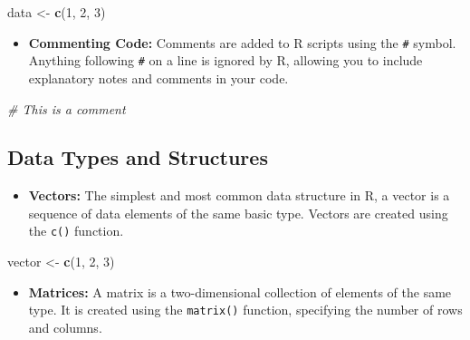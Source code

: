 \documentclass[
]{book}
\newenvironment{Shaded}{\begin{snugshade}}{\end{snugshade}}
\newcommand{\CommentTok}[1]{\textcolor[rgb]{0.56,0.35,0.01}{\textit{#1}}}
\newcommand{\DecValTok}[1]{\textcolor[rgb]{0.00,0.00,0.81}{#1}}
\newcommand{\FunctionTok}[1]{\textcolor[rgb]{0.13,0.29,0.53}{\textbf{#1}}}
\newcommand{\NormalTok}[1]{#1}
\newcommand{\OtherTok}[1]{\textcolor[rgb]{0.56,0.35,0.01}{#1}}
\providecommand{\tightlist}{%
  \setlength{\itemsep}{0pt}\setlength{\parskip}{0pt}}
\begin{document}
\begin{Shaded}
\begin{Highlighting}[]
\NormalTok{data }\OtherTok{\textless{}{-}} \FunctionTok{c}\NormalTok{(}\DecValTok{1}\NormalTok{, }\DecValTok{2}\NormalTok{, }\DecValTok{3}\NormalTok{)}
\end{Highlighting}
\end{Shaded}

\begin{itemize}
\tightlist
\item
  \textbf{Commenting Code:} Comments are added to R scripts using the \texttt{\#} symbol. Anything following \texttt{\#} on a line is ignored by R, allowing you to include explanatory notes and comments in your code.
\end{itemize}

\begin{Shaded}
\begin{Highlighting}[]
\CommentTok{\# This is a comment}
\end{Highlighting}
\end{Shaded}

\hypertarget{data-types-and-structures}{%
\subsection*{Data Types and Structures}\label{data-types-and-structures}}

\begin{itemize}
\tightlist
\item
  \textbf{Vectors:} The simplest and most common data structure in R, a vector is a sequence of data elements of the same basic type. Vectors are created using the \texttt{c()} function.
\end{itemize}

\begin{Shaded}
\begin{Highlighting}[]
\NormalTok{vector }\OtherTok{\textless{}{-}} \FunctionTok{c}\NormalTok{(}\DecValTok{1}\NormalTok{, }\DecValTok{2}\NormalTok{, }\DecValTok{3}\NormalTok{)}
\end{Highlighting}
\end{Shaded}

\begin{itemize}
\tightlist
\item
  \textbf{Matrices:} A matrix is a two-dimensional collection of elements of the same type. It is created using the \texttt{matrix()} function, specifying the number of rows and columns.
\end{itemize}
\end{document}
